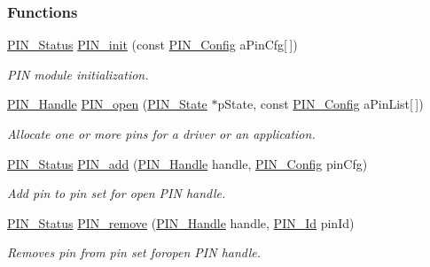 \subsubsection*{Functions}
\begin{DoxyCompactItemize}
\item 
\hyperlink{_p_i_n_8h_abe0ad59bbf09e51fe37195a5e70b23f6}{P\-I\-N\-\_\-\-Status} \hyperlink{_p_i_n_8h_a0de1df98a14e6e13b16db414e54472ef}{P\-I\-N\-\_\-init} (const \hyperlink{_p_i_n_8h_ae427b7d2925f9b0f3145e455cfdb5841}{P\-I\-N\-\_\-\-Config} a\-Pin\-Cfg\mbox{[}$\,$\mbox{]})
\begin{DoxyCompactList}\small\item\em P\-I\-N module initialization. \end{DoxyCompactList}\item 
\hyperlink{_p_i_n_8h_afb2de52b054638f63c39df1f30a0d88d}{P\-I\-N\-\_\-\-Handle} \hyperlink{_p_i_n_8h_a731c5bb641ffeb064579432adfc8dba0}{P\-I\-N\-\_\-open} (\hyperlink{_p_i_n_8h_a36ef69d50df6baa6973482669c24a522}{P\-I\-N\-\_\-\-State} $\ast$p\-State, const \hyperlink{_p_i_n_8h_ae427b7d2925f9b0f3145e455cfdb5841}{P\-I\-N\-\_\-\-Config} a\-Pin\-List\mbox{[}$\,$\mbox{]})
\begin{DoxyCompactList}\small\item\em Allocate one or more pins for a driver or an application. \end{DoxyCompactList}\item 
\hyperlink{_p_i_n_8h_abe0ad59bbf09e51fe37195a5e70b23f6}{P\-I\-N\-\_\-\-Status} \hyperlink{_p_i_n_8h_ae96b7cc445336d52f8f6db762ff80156}{P\-I\-N\-\_\-add} (\hyperlink{_p_i_n_8h_afb2de52b054638f63c39df1f30a0d88d}{P\-I\-N\-\_\-\-Handle} handle, \hyperlink{_p_i_n_8h_ae427b7d2925f9b0f3145e455cfdb5841}{P\-I\-N\-\_\-\-Config} pin\-Cfg)
\begin{DoxyCompactList}\small\item\em Add pin to pin set for open P\-I\-N handle. \end{DoxyCompactList}\item 
\hyperlink{_p_i_n_8h_abe0ad59bbf09e51fe37195a5e70b23f6}{P\-I\-N\-\_\-\-Status} \hyperlink{_p_i_n_8h_a7edb10913792e741318ef339d5c7ef13}{P\-I\-N\-\_\-remove} (\hyperlink{_p_i_n_8h_afb2de52b054638f63c39df1f30a0d88d}{P\-I\-N\-\_\-\-Handle} handle, \hyperlink{_p_i_n_8h_a9ae8197f460bb76ea09a84f47d09921f}{P\-I\-N\-\_\-\-Id} pin\-Id)
\begin{DoxyCompactList}\small\item\em Removes pin from pin set foropen P\-I\-N handle. \end{DoxyCompactList}\item 

\end{DoxyCompactItemize}
